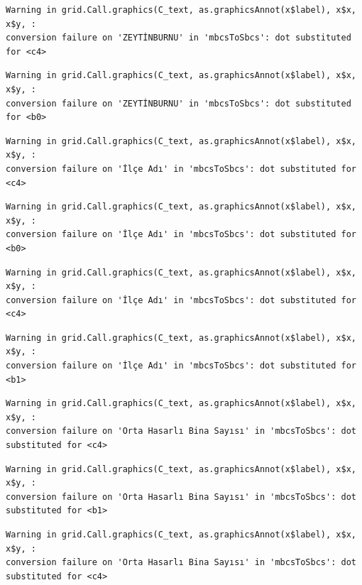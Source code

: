 \documentclass[
  11pt,
  a4paper,
  DIV=11,
  numbers=noendperiod]{scrartcl}
\begin{document}
\begin{verbatim}
Warning in grid.Call.graphics(C_text, as.graphicsAnnot(x$label), x$x, x$y, :
conversion failure on 'ZEYTİNBURNU' in 'mbcsToSbcs': dot substituted for <c4>
\end{verbatim}

\begin{verbatim}
Warning in grid.Call.graphics(C_text, as.graphicsAnnot(x$label), x$x, x$y, :
conversion failure on 'ZEYTİNBURNU' in 'mbcsToSbcs': dot substituted for <b0>
\end{verbatim}

\begin{verbatim}
Warning in grid.Call.graphics(C_text, as.graphicsAnnot(x$label), x$x, x$y, :
conversion failure on 'İlçe Adı' in 'mbcsToSbcs': dot substituted for <c4>
\end{verbatim}

\begin{verbatim}
Warning in grid.Call.graphics(C_text, as.graphicsAnnot(x$label), x$x, x$y, :
conversion failure on 'İlçe Adı' in 'mbcsToSbcs': dot substituted for <b0>
\end{verbatim}

\begin{verbatim}
Warning in grid.Call.graphics(C_text, as.graphicsAnnot(x$label), x$x, x$y, :
conversion failure on 'İlçe Adı' in 'mbcsToSbcs': dot substituted for <c4>
\end{verbatim}

\begin{verbatim}
Warning in grid.Call.graphics(C_text, as.graphicsAnnot(x$label), x$x, x$y, :
conversion failure on 'İlçe Adı' in 'mbcsToSbcs': dot substituted for <b1>
\end{verbatim}

\begin{verbatim}
Warning in grid.Call.graphics(C_text, as.graphicsAnnot(x$label), x$x, x$y, :
conversion failure on 'Orta Hasarlı Bina Sayısı' in 'mbcsToSbcs': dot
substituted for <c4>
\end{verbatim}

\begin{verbatim}
Warning in grid.Call.graphics(C_text, as.graphicsAnnot(x$label), x$x, x$y, :
conversion failure on 'Orta Hasarlı Bina Sayısı' in 'mbcsToSbcs': dot
substituted for <b1>
\end{verbatim}

\begin{verbatim}
Warning in grid.Call.graphics(C_text, as.graphicsAnnot(x$label), x$x, x$y, :
conversion failure on 'Orta Hasarlı Bina Sayısı' in 'mbcsToSbcs': dot
substituted for <c4>
\end{verbatim}
\end{document}
